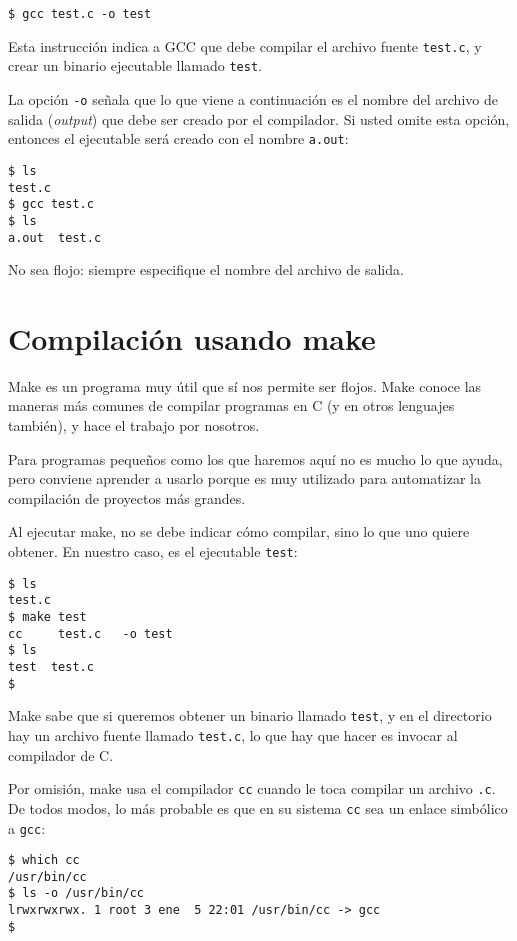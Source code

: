 \begin{lstlisting}
$ gcc test.c -o test
\end{lstlisting}

Esta instrucción indica a GCC que debe compilar el archivo fuente
\lstinline!test.c!, y crear un binario ejecutable llamado
\lstinline!test!.

La opción \lstinline!-o! señala que lo que viene a continuación es el
nombre del archivo de salida (\emph{output}) que debe ser creado por el
compilador. Si usted omite esta opción, entonces el ejecutable será
creado con el nombre \lstinline!a.out!:

\begin{lstlisting}
$ ls
test.c
$ gcc test.c
$ ls
a.out  test.c
\end{lstlisting}

No sea flojo: siempre especifique el nombre del archivo de salida.

\section{Compilación usando make}

Make es un programa muy útil que sí nos permite ser flojos. Make conoce
las maneras más comunes de compilar programas en C (y en otros lenguajes
también), y hace el trabajo por nosotros.

Para programas pequeños como los que haremos aquí no es mucho lo que
ayuda, pero conviene aprender a usarlo porque es muy utilizado para
automatizar la compilación de proyectos más grandes.

Al ejecutar make, no se debe indicar cómo compilar, sino lo que uno
quiere obtener. En nuestro caso, es el ejecutable \lstinline!test!:

\begin{lstlisting}
$ ls
test.c
$ make test
cc     test.c   -o test
$ ls
test  test.c
$
\end{lstlisting}

Make sabe que si queremos obtener un binario llamado \lstinline!test!, y
en el directorio hay un archivo fuente llamado \lstinline!test.c!, lo
que hay que hacer es invocar al compilador de C.

Por omisión, make usa el compilador \lstinline!cc! cuando le toca
compilar un archivo \lstinline!.c!. De todos modos, lo más probable es
que en su sistema \lstinline!cc! sea un enlace simbólico a
\lstinline!gcc!:

\begin{lstlisting}
$ which cc
/usr/bin/cc
$ ls -o /usr/bin/cc
lrwxrwxrwx. 1 root 3 ene  5 22:01 /usr/bin/cc -> gcc
$
\end{lstlisting}

